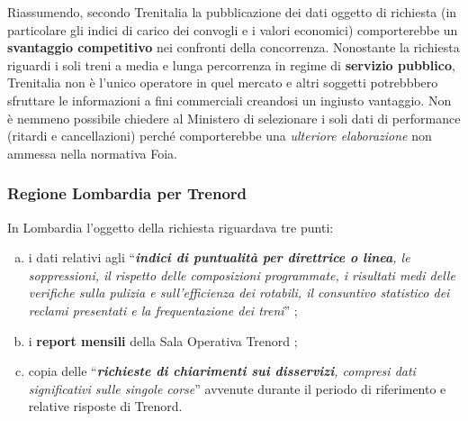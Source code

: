 \documentclass[12pt,a4paper,italian]{report}
\begin{document}
Riassumendo, secondo Trenitalia la pubblicazione dei dati oggetto di
richiesta (in particolare gli indici di carico dei convogli e i valori
economici) comporterebbe un \textbf{svantaggio competitivo} nei
confronti della concorrenza.  Nonostante la richiesta riguardi i soli
treni a media e lunga percorrenza in regime di \textbf{servizio
    pubblico}, Trenitalia non è l'unico operatore in quel mercato e
altri soggetti potrebbbero sfruttare le informazioni a fini
commerciali creandosi un ingiusto vantaggio.  Non è nemmeno possibile
chiedere al Ministero di selezionare i soli dati di performance
(ritardi e cancellazioni) perché comporterebbe una \textit{ulteriore
    elaborazione} non ammessa nella normativa Foia.

\subsubsection{Regione Lombardia per Trenord}

In Lombardia l'oggetto della richiesta riguardava tre punti:
\begin{enumerate}[a)]
    \item i dati relativi agli ``\textit{\textbf{indici di puntualità
            per direttrice o linea}, le soppressioni, il rispetto
        delle composizioni programmate, i risultati medi delle
        verifiche sulla pulizia e sull'efficienza dei rotabili, il
        consuntivo statistico dei reclami presentati e la
        frequentazione dei treni}'' \cite[allegato 11]{LombardiaDati};
    \item i \textbf{report mensili} della Sala Operativa Trenord
    \cite[art.\@ 31, paragrafo 3]{LombardiaDati};
    \item copia delle ``\textit{\textbf{richieste di chiarimenti sui
            disservizi}, compresi dati significativi sulle singole
        corse}'' \cite[art.\@ 32, paragrafo 6]{LombardiaDati} avvenute
    durante il periodo di riferimento e relative risposte di Trenord.
\end{enumerate}
\end{document}
